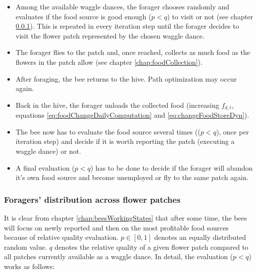 			\begin{itemize}
				\item Among the available waggle dances, the forager chooses randomly and evaluates if the food source is good enough ($p < q$) to visit or not (see chapter \ref{chap:foragersDistribution}). This is repeated in every iteration step until the forager decides to visit the flower patch represented by the chosen waggle dance.
				\item The forager flies to the patch and, once reached, collects as much food as the flowers in the patch allow (see chapter \ref{chap:foodCollection}).
				\item After foraging, the bee returns to the hive. Path optimization may occur again.
				\item Back in the hive, the forager unloads the collected food (increasing $f_{d,t}$, equations \ref{eq:foodChangeDailyComputation} and \ref{eq:changeFoodStoreDyn}).
				\item The bee now has to evaluate the food source several times (($p < q$), once per iteration step) and decide if it is worth reporting the patch (executing a waggle dance) or not.
				\item A final evaluation ($p < q$) has to be done to decide if the forager will abandon it's own food source and become unemployed or fly to the same patch again.
			\end{itemize}
					
		\subsubsection{Foragers' distribution across flower patches}
			\label{chap:foragersDistribution}
			It is clear from chapter \ref{chap:beesWorkingStates} that after some time, the bees will focus on newly reported and then on the most profitable food sources because of relative quality evaluation. $p \in {[0,1]}$ denotes an equally distributed random value. $q$ denotes the relative quality of a given flower patch compared to all patches currently available as a waggle dance. In detail, the evaluation ($p < q$) works as follows:\\
			

